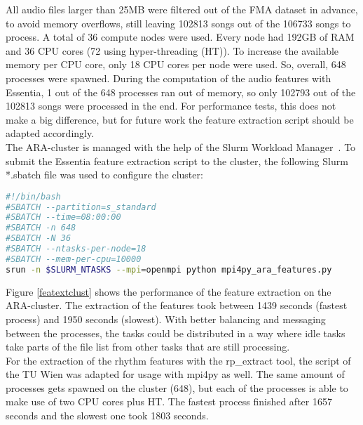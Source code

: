\noindent All audio files larger than 25MB were filtered out of the FMA dataset in advance, to avoid memory overflows, still leaving 102813 songs out of the 106733 songs to process. A total of 36 compute nodes were used. Every node had 192GB of RAM and 36 CPU cores (72 using hyper-threading (HT)). To increase the available memory per CPU core, only 18 CPU cores per node were used. So, overall, 648 processes were spawned. During the computation of the audio features with Essentia, 1 out of the 648 processes ran out of memory, so only 102793 out of the 102813 songs were processed in the end. For performance tests, this does not make a big difference, but for future work the feature extraction script should be adapted accordingly.\\
The ARA-cluster is managed with the help of the Slurm Workload Manager~\cite{slurm}. To submit the Essentia feature extraction script to the cluster, the following Slurm *.sbatch file was used to configure the cluster: 
\begin{lstlisting}[language=bash,frame=single,caption={Slurm *.sbatch file for feature extraction with Essentia on the ARA-cluster},captionpos=b,label={lst:sbatch}]
#!/bin/bash
#SBATCH --partition=s_standard
#SBATCH --time=08:00:00
#SBATCH -n 648
#SBATCH -N 36
#SBATCH --ntasks-per-node=18
#SBATCH --mem-per-cpu=10000
srun -n $SLURM_NTASKS --mpi=openmpi python mpi4py_ara_features.py
\end{lstlisting}
\noindent Figure \ref{featextclust} shows the performance of the feature extraction on the ARA-cluster. The extraction of the features took between 1439 seconds (fastest process) and 1950 seconds (slowest). With better balancing and messaging between the processes, the tasks could be distributed in a way where idle tasks take parts of the file list from other tasks that are still processing.\\
\noindent For the extraction of the rhythm features with the rp\_extract tool, the script of the TU Wien was adapted for usage with mpi4py as well. The same amount of processes gets spawned on the cluster (648), but each of the processes is able to make use of two CPU cores plus HT. The fastest process finished after 1657 seconds and the slowest one took 1803 seconds.


